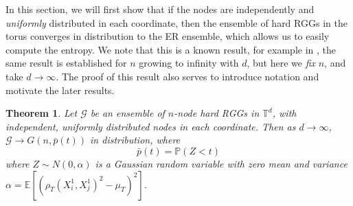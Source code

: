 \documentclass{article}
\newtheorem{theorem}{Theorem}
\newcommand{\tti}{\rightarrow\infty}
\newcommand{\graph}{\mathcal{G}}
\newcommand{\prob}[1]{\mathbb{P}\left(#1\right)}
\begin{document}
 In this section, we will first show that if the nodes are independently and \textit{uniformly} distributed in each coordinate, then the ensemble of hard RGGs in the torus converges in distribution to the ER ensemble, which allows us to easily compute the entropy. We note that this is a known result, for example in \cite{friedrich2023cliques, baguley2025testing}, the same result is established for $n$ growing to infinity with $d$, but here we \textit{fix} $n$, and take $d\tti$. The proof of this result also serves to introduce notation and motivate the later results.
\begin{theorem}
    \label{thm:torus_entropy}
    Let $\mathcal{G}$ be an ensemble of $n$-node hard RGGs in $\mathbb{T}^d$, with independent, uniformly distributed nodes in each coordinate. Then as $d\tti$, $\graph \rightarrow G(n,\bar{p}(t))$ in distribution, where
    \begin{equation}
        \label{eq:gaussian_cdf}
        \bar{p}(t) = \prob{Z < t}
    \end{equation}
    where $Z \sim N(0, \alpha)$ is a Gaussian random variable with zero mean and variance $\alpha = \mathbb{E}[(\rho_T(X_i^1,X_j^1)^2-\mu_T)^2]$. 
\end{theorem}
\end{document}
